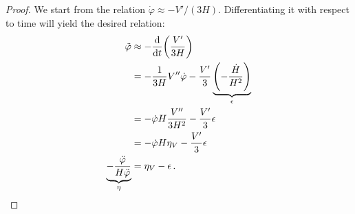 \documentclass[main.tex]{subfiles}
\begin{document}
\begin{proof}
We start from the relation \(\dot{\varphi} \approx - V' / (3H)\). Differentiating it with respect to time will yield the desired relation: 
%
\begin{align}
\ddot{\varphi} &\approx - \dv{}{t} \qty( \frac{V'}{3H})  \\
&= - \frac{1}{3H} V'' \dot{\varphi} - \frac{V'}{3} \underbrace{\qty(- \frac{\dot{H}}{H^2})}_{\epsilon }  \\
&= - \dot{\varphi} H \frac{V''}{3H^2} - \frac{V'}{3} \epsilon  \\
&= - \dot{\varphi} H \eta _V - \frac{V'}{3} \epsilon  \\
\underbrace{-\frac{\ddot{\varphi}}{H \ddot{\varphi}}}_{\eta } &= \eta _V - \epsilon  
\,.
\end{align}
\end{proof}

\end{document}

